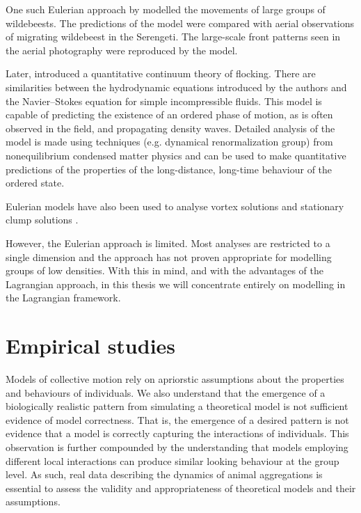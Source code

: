 One such Eulerian approach by \textcite{gueron93} modelled the movements of large groups of wildebeests. The predictions of the model were compared with aerial observations of migrating wildebeest in the Serengeti. The large-scale front patterns seen in the aerial photography were reproduced by the model.

Later, \textcite{toner98} introduced a quantitative continuum theory of flocking. There are similarities between the hydrodynamic equations introduced by the authors and the Navier--Stokes equation for simple incompressible fluids. This model is capable of predicting the existence of an ordered phase of motion, as is often observed in the field, and propagating density waves. Detailed analysis of the model is made using techniques (e.g. dynamical renormalization group) from nonequilibrium condensed matter physics and can be used to make quantitative predictions of the properties of the long-distance, long-time behaviour of the ordered state.

Eulerian models have also been used to analyse vortex solutions \parencite{topaz04} and stationary clump solutions \parencite{topaz06}.

However, the Eulerian approach is limited. Most analyses are restricted to a single dimension and the approach has not proven appropriate for modelling groups of low densities. With this in mind, and with the advantages of the Lagrangian approach, in this thesis we will concentrate entirely on modelling in the Lagrangian framework.

\section{Empirical studies}
\label{sec:empirical_studies}

Models of collective motion rely on apriorstic assumptions about the properties and behaviours of individuals. We also understand that the emergence of a biologically realistic pattern from simulating a theoretical model is not sufficient evidence of model correctness. That is, the emergence of a desired pattern is not evidence that a model is correctly capturing the interactions of individuals. This observation is further compounded by the understanding that models employing different local interactions can produce similar looking behaviour at the group level. As such, real data describing the dynamics of animal aggregations is essential to assess the validity and appropriateness of theoretical models and their assumptions.

